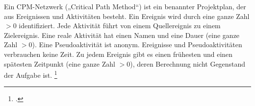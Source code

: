 \documentclass{lehramt-informatik-aufgabe}
\begin{document}

Ein CPM-Netzwerk („Critical Path Method“) ist ein benannter
Projektplan, der aus Ereignissen und Aktivitäten besteht. Ein Ereignis
wird durch eine ganze Zahl $> 0$ identifiziert. Jede Aktivität führt von
einem Quellereignis zu einem Zielereignis. Eine reale Aktivität hat
einen Namen und eine Dauer (eine ganze Zahl $> 0$). Eine Pseudoaktivität
ist anonym. Ereignisse und Pseudoaktivitäten verbrauchen keine Zeit. Zu
jedem Ereignis gibt es einen frühesten und einen spätesten Zeitpunkt
(eine ganze Zahl $> 0$), deren Berechnung nicht Gegenstand der Aufgabe
ist.
\footcite{examen:66116:2019:09}
\end{document}
